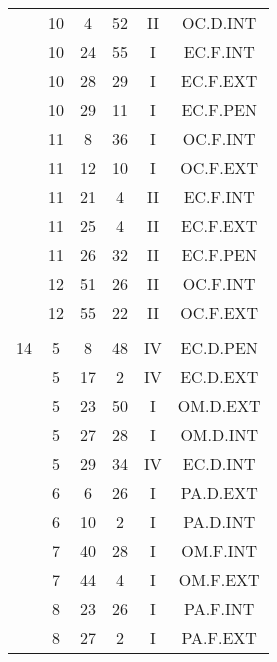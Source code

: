 \documentclass[12pt, a4paper]{article}
\begin{document}
\begin{multicols}{3}
{\begin{tabular}{c c c c c c}
	 	 	 	 & 10 & 4 & 52 & II & OC.D.INT\\%
	 	 	 	 & 10 & 24 & 55 & I & EC.F.INT\\%
	 	 	 	 & 10 & 28 & 29 & I & EC.F.EXT\\%
	 	 	 	 & 10 & 29 & 11 & I & EC.F.PEN\\%
	 	 	 	 & 11 & 8 & 36 & I & OC.F.INT\\%
	 	 	 	 & 11 & 12 & 10 & I & OC.F.EXT\\%
	 	 	 	 & 11 & 21 & 4 & II & EC.F.INT\\%
	 	 	 	 & 11 & 25 & 4 & II & EC.F.EXT\\%
	 	 	 	 & 11 & 26 & 32 & II & EC.F.PEN\\%
	 	 	 	 & 12 & 51 & 26 & II & OC.F.INT\\%
	 	 	 	 & 12 & 55 & 22 & II & OC.F.EXT\\%
	 	 	 	 & & & & & \\%
	 	 	 	14 & 5 & 8 & 48 & IV & EC.D.PEN\\%
	 	 	 	 & 5 & 17 & 2 & IV & EC.D.EXT\\%
	 	 	 	 & 5 & 23 & 50 & I & OM.D.EXT\\%
	 	 	 	 & 5 & 27 & 28 & I & OM.D.INT\\%
	 	 	 	 & 5 & 29 & 34 & IV & EC.D.INT\\%
	 	 	 	 & 6 & 6 & 26 & I & PA.D.EXT\\%
	 	 	 	 & 6 & 10 & 2 & I & PA.D.INT\\%
	 	 	 	 & 7 & 40 & 28 & I & OM.F.INT\\%
	 	 	 	 & 7 & 44 & 4 & I & OM.F.EXT\\%
	 	 	 	 & 8 & 23 & 26 & I & PA.F.INT\\%
	 	 	 	 & 8 & 27 & 2 & I & PA.F.EXT\\%

\end{tabular}}
\end{multicols}
\end{document}
